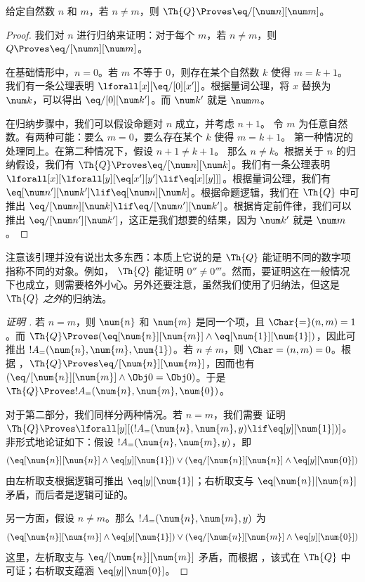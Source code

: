\documentclass[../../../include/open-logic-section]{subfiles}
\begin{document}
\begin{lem}
 给定自然数 $n$ 和 $m$，若 $n
\neq m$，则 $\Th{Q} \Proves \eq/[\num n][\num m]$。
\end{lem}

\begin{proof}
我们对 $n$ 进行归纳来证明：对于每个 $m$，若 $n \neq m$，则
$Q \Proves \eq/[\num n][\num m]$。

在基础情形中，$n = 0$。若 $m$ 不等于 $0$，则存在某个自然数 $k$ 使得 $m = k + 1$。
我们有一条公理表明
$\lforall[x][\eq/[0][x']]$。根据量词公理，将 $x$ 替换为
$\num k$，可以得出 $\eq/[0][\num k']$。而 $\num k'$ 就是
$\num m$。

在归纳步骤中，我们可以假设命题对 $n$ 成立，并考虑 $n+1$。
令 $m$ 为任意自然数。有两种可能：要么 $m = 0$，要么存在某个 $k$ 使得 $m = k+1$。
第一种情况的处理同上。在第二种情况下，假设 $n+1 \neq k+1$。
那么 $n \neq k$。根据关于 $n$ 的归纳假设，我们有
$\Th{Q} \Proves \eq/[\num n][\num k]$。我们有一条公理表明
$\lforall[x][\lforall[y][\eq[x'][y'] \lif \eq[x][y]]]$。根据量词公理，我们有
$\eq[\num n'][\num k'] \lif \eq[\num n][\num
  k]$。根据命题逻辑，我们在 $\Th{Q}$ 中可推出
$\eq/[\num n][\num k] \lif \eq/[\num n'][\num k']$。根据肯定前件律，我们可以推出
$\eq/[\num n'][\num k']$，这正是我们想要的结果，因为 $\num k'$ 就是 $\num m$。
\end{proof}

\begin{explain}
注意该引理并没有说出太多东西：本质上它说的是 $\Th{Q}$ 能证明不同的数字项指称不同的对象。例如，
$\Th{Q}$ 能证明 $0'' \neq 0'''$。然而，要证明这在一般情况下也成立，则需要格外小心。另外还要注意，虽然我们使用了归纳法，但这是 $\Th{Q}$ \emph{之外}的归纳法。
\end{explain}

\begin{proof}[证明 ]
若 $n = m$，则 $\num{n}$ 和 $\num{m}$ 是同一个项，且
$\Char{=}(n, m) = 1$。而 $\Th{Q} \Proves (\eq[\num{n}][\num{m}] \land
\eq[\num{1}][\num{1}])$，因此可推出 $!A_=(\num{n}, \num{m},
\num{1})$。若 $n \neq m$，则 $\Char=(n, m) = 0$。根据
，$\Th{Q} \Proves \eq/[\num{n}][\num{m}]$，因而也有
$(\eq/[\num{n}][\num{m}] \land \Obj 0 = \Obj 0)$。于是 $\Th{Q}
\Proves !A_=(\num{n}, \num{m}, \num{0})$。

对于第二部分，我们同样分两种情况。若 $n = m$，我们需要
证明 $\Th{Q} \Proves \lforall[y][(!A_=(\num{n}, \num{m}, y)
  \lif \eq[y][\num{1}])]$。非形式地论证如下：假设
$!A_=(\num{n},
\num{m}, y)$，即
\[
(\eq[\num{n}][\num{n}] \land \eq[y][\num{1}]) \lor
(\eq/[\num{n}][\num{n}] \land \eq[y][\num{0}])
\]
由左析取支根据逻辑可推出 $\eq[y][\num{1}]$；右析取支与
$\eq[\num{n}][\num{n}]$ 矛盾，而后者是逻辑可证的。

另一方面，假设 $n \neq m$。那么 $!A_=(\num{n},
\num{m}, y)$ 为
\[
(\eq[\num{n}][\num{m}] \land \eq[y][\num{1}]) \lor
(\eq/[\num{n}][\num{m}] \land \eq[y][\num{0}])
\]
这里，左析取支与 $\eq/[\num{n}][\num{m}]$ 矛盾，而根据
，该式在 $\Th{Q}$ 中可证；右析取支蕴涵 $\eq[y][\num{0}]$。
\end{proof}
\end{document}
